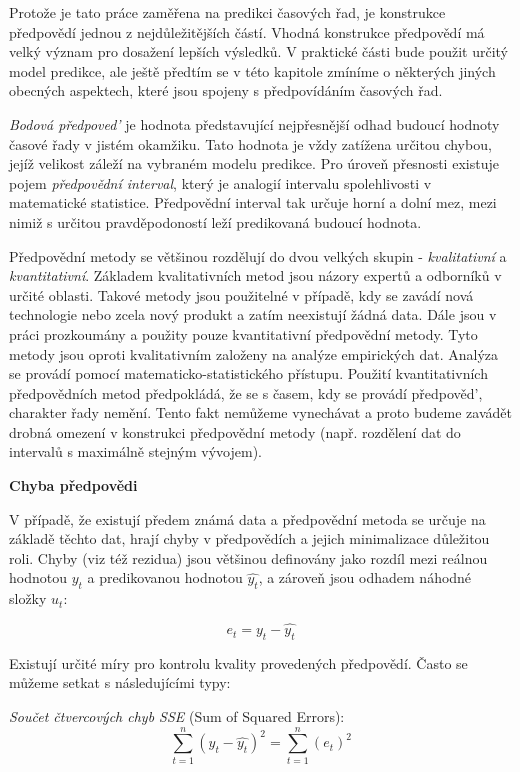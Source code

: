 \documentclass[a4paper,12pt,twoside]{scrreprt}
\begin{document}
Protože je tato práce zaměřena na predikci časových řad, je konstrukce předpovědí jednou z nejdůležitějších částí. Vhodná konstrukce předpovědí má velký význam pro dosažení lepších výsledků. V praktické části bude použit určitý model predikce, ale ještě předtím se v této kapitole zmíníme o některých jiných obecných aspektech, které jsou spojeny s předpovídáním časových řad. 

\textit{Bodová předpoved'} je hodnota představující nejpřesnější odhad budoucí hodnoty časové řady v jistém okamžiku. Tato hodnota je vždy zatížena určitou chybou, jejíž velikost záleží na vybraném modelu predikce. Pro úroveň přesnosti existuje pojem \textit{předpovědní interval}, který je analogií intervalu spolehlivosti v matematické statistice. Předpovědní interval tak určuje horní a dolní mez, mezi nimiž s určitou pravděpodoností leží predikovaná budoucí hodnota.  

Předpovědní metody se většinou rozdělují do dvou velkých skupin - \textit{kvalitativní} a \textit{kvantitativní}. Základem kvalitativních metod jsou názory expertů a odborníků v určité oblasti. Takové metody jsou použitelné v případě, kdy se zavádí nová technologie nebo zcela nový produkt a zatím neexistují žádná data. Dále jsou v práci prozkoumány a použity pouze kvantitativní předpovědní metody. Tyto metody jsou oproti kvalitativním založeny na analýze empirických dat. Analýza se provádí pomocí matematicko-statistického přístupu. Použití kvantitativních předpovědních metod předpokládá, že se s časem, kdy se provádí předpověd', charakter řady nemění. Tento fakt nemůžeme vynechávat a proto budeme zavádět drobná omezení v konstrukci předpovědní metody (např. rozdělení dat do intervalů s maximálně stejným vývojem). \cite{cipra}

\normalsize \textbf{Chyba předpovědi}

V případě, že existují předem známá data a předpovědní metoda se určuje na základě těchto dat, hrají chyby v předpovědích a jejich minimalizace důležitou roli. Chyby (viz též rezidua) jsou většinou definovány jako rozdíl mezi reálnou hodnotou $y_t$ a predikovanou hodnotou $\hat{y_t}$, a zároveň jsou odhadem náhodné složky $u_t$:

\begin{equation}
e_t = y_t - \hat{y_t}
\end{equation}

Existují určité míry pro kontrolu kvality provedených předpovědí. Často se můžeme setkat s následujícími typy: 

\textit{Součet čtvercových chyb SSE} (Sum of Squared Errors):
\begin{equation}
\sum_{t=1}^{n}(y_t - \hat{y_t})^2 = \sum_{t=1}^{n}(e_t)^2
\end{equation}
\end{document}
